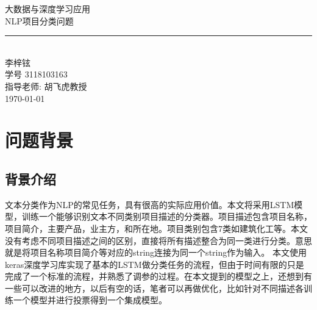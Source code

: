\documentclass[UTF8]{ctexart}
\newcommand{\labtitle}{NLP项目分类问题}
\newcommand{\authorname}{李梓铉}
\newcommand{\professor}{胡飞虎教授}
\newcommand{\classno}{3118103163}
\begin{document}


\begin{titlepage}
\begin{center}
{\LARGE \textsc{大数据与深度学习应用} \\ \vspace{4pt}}
{\Large \textsc{\labtitle} \\ \vspace{4pt}}
\rule[13pt]{\textwidth}{1pt} \\ \vspace{150pt}
{\large  \authorname \\ \vspace{10pt}
学号 \classno\\ \vspace{10pt}
指导老师: \professor \\ \vspace{10pt}
\today}
\end{center}
\end{titlepage}





\section{问题背景}
\subsection{背景介绍}

文本分类作为NLP的常见任务，具有很高的实际应用价值。本文将采用LSTM模型，训练一个能够识别文本不同类别项目描述的分类器。项目描述包含项目名称，项目简介，主要产品，业主方，和所在地。项目类别包含7类如建筑化工等。本文没有考虑不同项目描述之间的区别，直接将所有描述整合为同一类进行分类。意思就是将项目名称项目简介等对应的string连接为同一个string作为输入。
本文使用keras深度学习库实现了基本的LSTM做分类任务的流程，但由于时间有限的只是完成了一个标准的流程，并熟悉了调参的过程。在本文提到的模型之上，还想到有一些可以改进的地方，以后有空的话，笔者可以再做优化，比如针对不同描述各训练一个模型并进行投票得到一个集成模型。
\end{document}
